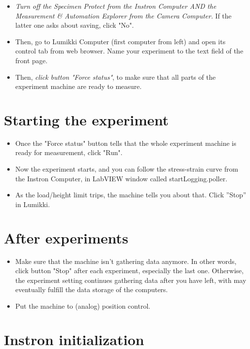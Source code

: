 \documentclass[a4paper]{article}
\begin{document}
\begin{itemize}
  \item \textit{Turn off the Specimen Protect from the Instron Computer AND the Measurement \& Automation Explorer from the Camera Computer.} If the latter one asks about saving, click "No".
  \item Then, go to Lumikki Computer (first computer from left) and open its control tab from web browser. Name your experiment to the text field of the front page.
  \item Then, \textit{click button "Force status"}, to make sure that all parts of the experiment machine are ready to measure. 
\end{itemize}

\section{Starting the experiment} 

\begin{itemize}
  \item Once the "Force status" button tells that the whole experiment machine is ready for measurement, click "Run".
  \item Now the experiment starts, and you can follow the stress-strain curve from the Instron Computer, in LabVIEW  window called startLogging.poller.
  \item As the load/height limit trips, the machine tells you about that. Click ''Stop'' in Lumikki.
\end{itemize}

\section{After experiments}

\begin{itemize}
  \item Make sure that the machine isn't gathering data anymore. In other words, click button "Stop" after each experiment, especially the last one. Otherwise, the experiment setting continues gathering data after you have left, with may eventually fulfill the data storage of the computers.
  \item Put the machine to (analog) position control.
\end{itemize}

\clearpage

\section{Instron initialization}
\end{document}
